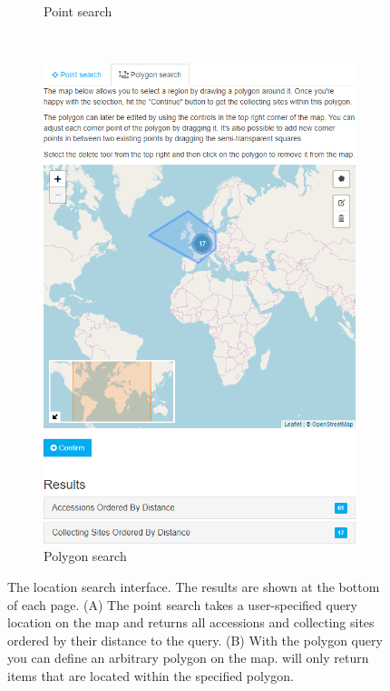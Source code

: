 \begin{figure}
\begin{subfigure}[b]{0.47\linewidth}
		\caption{Point search}
		\label{fig:features:location-search-point}
	\end{subfigure}
	~
	\begin{subfigure}[b]{0.47\linewidth}
		\includegraphics[width=1\linewidth]{img/features/location-search-polygon.png}
		\caption{Polygon search}
		\label{fig:features:location-search-polygon}
	\end{subfigure}
	\caption{The location search interface. The results are shown at the bottom of each page. (A) The point search takes a user-specified query location on the map and returns all accessions and collecting sites ordered by their distance to the query. (B) With the polygon query you can define an arbitrary polygon on the map. {\germinate} will only return items that are located within the specified polygon.}
	\label{fig:features:location-search}
\end{figure}

